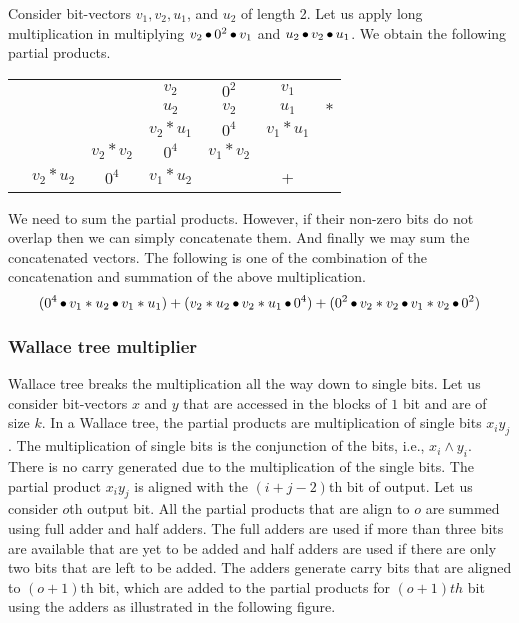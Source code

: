 \begin{example}
  Consider bit-vectors $v_1,v_2,u_1$, and $u_2$ of length 2.
  Let us apply long multiplication in multiplying
  $v_2 \mathop{\bullet} 0^2 \mathop{\bullet} v_1$ and $u_2 \mathop{\bullet} v_2 \mathop{\bullet} u_1$.
  We obtain the following partial products.
\begin{center}
\begin{tabular}{c@{\quad}c@{\quad}c@{\quad}c@{\quad}c@{\quad}c@{\quad}c}
  &&& $v_2$ & $0^2$ & $v_1$&\\ 
  &&& $u_2$ & $v_2$ & $u_1$&$*$\\ \hline
  &&&$v_2*u_1$& $0^4$ & $v_1*u_1$&\\
  &&$v_2*v_2$&$0^4$& $v_1*v_2$ && \\
  &$v_2*u_2$& $0^4$ &$v_1*u_2$&  & +&\\\hline
\end{tabular}
\end{center}
We need to sum the partial products. However, if their non-zero bits 
do not overlap then we can simply concatenate them.
%
And finally we may sum the concatenated vectors.
%
The following is one of the combination of the concatenation and 
summation of the above multiplication.
$$
( 0^4 \mathop{\bullet} v_1*u_2 \mathop{\bullet} v_1*u_1) +
(v_2*u_2 \mathop{\bullet} v_2*u_1 \mathop{\bullet} 0^4) +
(0^2 \mathop{\bullet} v_2*v_2 \mathop{\bullet} v_1*v_2 \mathop{\bullet} 0^2)
$$
\end{example}


\subsubsection{Wallace tree multiplier}
%
Wallace tree breaks the multiplication all the way down to single bits.
%
Let us consider bit-vectors $x$ and $y$ that are accessed in the blocks of $1$
bit and are of size $k$.
%
In a Wallace tree, the partial products are multiplication of single
bits $x_iy_j$.
%
The multiplication of single bits is the conjunction of the bits, i.e.,
$x_i \land y_i$.%
%
There is no carry generated due to the multiplication of the single bits.
%
The partial product $x_iy_j$ is aligned with the $(i+j-2)$th bit of output.
%
Let us consider $o$th output bit.
%
All the partial products that are align to $o$ are summed using full adder 
and half adders.
%
The full adders are used
if more than three bits are available that are yet to be added
and half adders are used if there are only two bits that are left to be added.
%
The adders generate carry bits that are aligned to $(o+1)$th bit,
which are added to the partial products for $(o+1)th$ bit using the 
adders as illustrated in the following figure.

